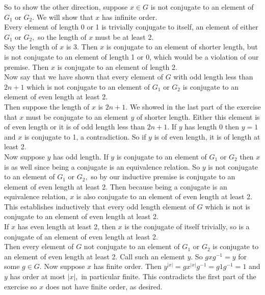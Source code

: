 \documentclass{article}
\begin{document}
So to show the other direction, suppose $x\in G$ is not conjugate to an element of $G_1$ or $G_2.$  We will show that $x$ has infinite order.
\\
Every element of length 0 or 1 is trivially conjugate to itself, an element of either $G_1$ or $G_2,$ so the length of $x$ must be at least 2.
\\
Say the length of $x$ is 3.  Then $x$ is conjugate to an element of shorter length, but is not conjugate to an element of length 1 or 0, which would be a violation of our premise.  Then $x$ is conjugate to an element of length 2.
\\
Now say that we have shown that every element of $G$ with odd length less than $2n+1$ which is not conjugate to an element of $G_1$ or $G_2$ is conjugate to an element of even length at least 2.
\\
Then suppose the length of $x$ is $2n+1.$  We showed in the last part of the exercise that $x$ must be conjugate to an element $y$ of shorter length.  Either this element is of even length or it is of odd length less than $2n+1.$  If $y$ has length 0 then $y=1$ and $x$ is conjugate to 1, a contradiction.  So if $y$ is of even length, it is of length at least 2.
\\
Now suppose $y$ has odd length.  If $y$ is conjugate to an element of $G_1$ or $G_2$ then $x$ is as well since being a conjugate is an equivalence relation.  So $y$ is not conjugate to an element of $G_1$ or $G_2,$ so by our inductive premise is conjugate to an element of even length at least 2.  Then because being a conjugate is an equivalence relation, $x$ is also conjugate to an element of even length at least 2.
\\
This establishes inductively that every odd length element of $G$ which is not is conjugate to an element of even length at least 2.
\\
If $x$ has even length at least 2, then $x$ is the conjugate of itself trivially, so is a conjugate of an element of even length at least 2.
\\
Then every element of $G$ not conjugate to an element of $G_1$ or $G_2$ is conjugate to an element of even length at least 2.  Call such an element $y.$  So $gxg^{-1}=y$ for some $g\in G.$  Now suppose $x$ has finite order.  Then $y^{|x|}=gx^{|x|}g^{-1}=g1g^{-1}=1$ and $y$ has order at most $|x|,$ in particular finite.  This contradicts the first part of the exercise so $x$ does not have finite order, as desired.
\end{document}
